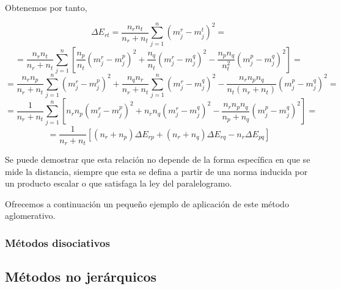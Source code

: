 Obtenemos por tanto,

\[
\Delta E_{rt} = \frac{n_{r}n_{t}}{n_{r}+n_{t}} \sum_{j=1}^{n} (m^{r}_{j}-m^{t}_{j})^{2} = 
\]
\[
= \frac{n_{r}n_{t}}{n_{r}+n_{t}}\sum_{j=1}^{n} \left[\frac{n_{p}}{n_{t}}(m^{r}_{j} - m^{p}_{j})^{2} + \frac{n_{q}}{n_{t}}(m^{r}_{j} - m^{q}_{j})^{2} - \frac{n_{p}n_{q}}{n_{t}^{2}}(m^{p}_{j}-m^{q}_{j})^{2}\right] = 
\]
\[
= \frac{n_{r}n_{p}}{n_{r}+n_{t}}\sum_{j=1}^{n} (m^{r}_{j} - m^{p}_{j})^{2} + \frac{n_{q}n_{r}}{n_{r}+n_{t}}\sum_{j=1}^{n}(m^{r}_{j} - m^{q}_{j})^{2} - \frac{n_{r}n_{p}n_{q}}{n_{t}(n_{r}+n_{t})}(m^{p}_{j}-m^{q}_{j})^{2} = 
\]
\[
= \frac{1}{n_{r}+n_{t}}\sum_{j=1}^{n}\left[n_{r}n_{p}(m^{r}_{j}-m^{p}_{j})^{2} + n_{r}n_{q}(m^{r}_{j}-m^{q}_{j})^{2} - \frac{n_{r}n_{p}n_{q}}{n_{p}+n_{q}}(m^{p}_{j}-m^{q}_{j})^{2}\right] =
\]
\[
= \frac{1}{n_{r}+n_{t}}[(n_{r}+n_{p})\Delta E_{rp} + (n_{r}+n_{q})\Delta E_{rq} - n_{r}\Delta E_{pq}]
\]

\vspace{0.5cm}

\begin{nota}
    Se puede demostrar que esta relación no depende de la forma específica en que se mide la distancia, siempre que esta se defina a partir de 
    una norma inducida por un producto escalar o que satisfaga la ley del paralelogramo.
\end{nota}

\vspace{0.5cm}

Ofrecemos a continuación un pequeño ejemplo de aplicación de este método aglomerativo.

\begin{ejemplo}
    
\end{ejemplo}


\subsubsection{Métodos disociativos}

\subsection{Métodos no jerárquicos}


